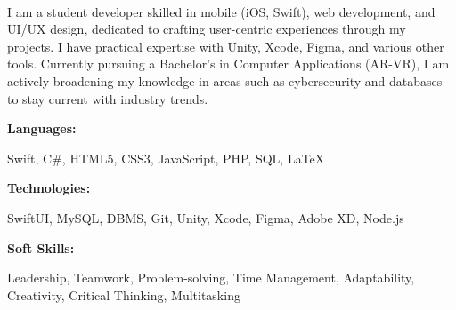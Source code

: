 \documentclass[9pt]{developercv} %
\begin{document}
\vspace{-11pt}
\begin{minipage}[t]{0.45\textwidth} %
  \\
I am a student developer skilled in mobile (iOS, Swift), web development, and UI/UX design, dedicated to crafting user-centric experiences through my projects. I have practical expertise with Unity, Xcode, Figma, and various other tools. Currently pursuing a Bachelor's in Computer Applications (AR-VR), I am actively broadening my knowledge in areas such as cybersecurity and databases to stay current with industry trends.
\end{minipage}
\hfill %
\begin{minipage}[t]{0.465\textwidth}
   
    \begin{minipage}[t]{0.2\textwidth}
        \textbf{Languages:}
        \vspace{-2pt}
    \end{minipage}
    \hfill
    \begin{minipage}[t]{0.73\textwidth}
        Swift, C\#, HTML5, CSS3, JavaScript, PHP, SQL, LaTeX  
    \end{minipage}

    \vspace{8pt} %
    
    \begin{minipage}[t]{0.2\textwidth}
        \textbf{Technologies:}
        \vspace{-2pt}
    \end{minipage}
    \hfill
    \begin{minipage}[t]{0.73\textwidth}
        SwiftUI, MySQL, DBMS, Git, Unity, Xcode, Figma, Adobe XD, Node.js
    \end{minipage}
    
    \vspace{8pt} %
    
    \begin{minipage}[t]{0.2\textwidth}
        \textbf{Soft Skills:}
        \vspace{-2pt}
    \end{minipage}
    \hfill
    \begin{minipage}[t]{0.73\textwidth}
       Leadership, Teamwork, Problem-solving, Time Management, Adaptability, \\Creativity, Critical Thinking, Multitasking
    \end{minipage}
    
\end{minipage}
\end{document}
